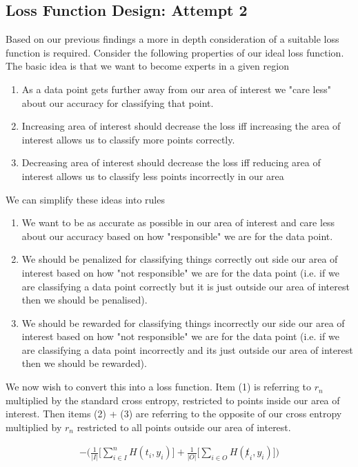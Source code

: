 \documentclass{article}
\begin{document}
\subsection{Loss Function Design: Attempt 2}
Based on our previous findings a more in depth consideration of a suitable loss function is required. Consider the following properties of our ideal loss function. The basic idea is that we want to become experts in a given region
\begin{enumerate}
\item As a data point gets further away from our area of interest we "care less" about our accuracy for classifying that point.
\item Increasing area of interest should decrease the loss iff increasing the area of interest allows us to classify more points correctly.
\item Decreasing area of interest should decrease the loss iff reducing area of interest allows us to classify less points incorrectly in our area
\end{enumerate}

We can simplify these ideas into rules

\begin{enumerate}
\item We want to be as accurate as possible in our area of interest and care less about our accuracy based on how "responsible" we are for the data point.
\item We should be penalized for classifying things correctly out side our area of interest based on how "not responsible" we are for the data point (i.e. if we are classifying a data point correctly but it is just outside our area of interest then we should be penalised).
\item We should be rewarded for classifying things incorrectly our side our area of interest based on how "not responsible" we are for the data point (i.e. if we are classifying a data point incorrectly and its just outside our area of interest then we should be rewarded).
\end{enumerate}

We now wish to convert this into a loss function. Item (1) is referring to $r_n$ multiplied by the standard cross entropy, restricted to points inside our area of interest. Then items (2) + (3) are referring to the opposite of our cross entropy multiplied by $r_n$ restricted to all points outside our area of interest.

\begin{align}
- \big( \frac{1}{|I|} \big[ \sum_{i \in I}^n H(t_i, y_i) \big] + \frac{1}{|O|} \big[ \sum_{i \in O} H(\not t_i, y_i) \big] \big)
\end{align}
\end{document}
